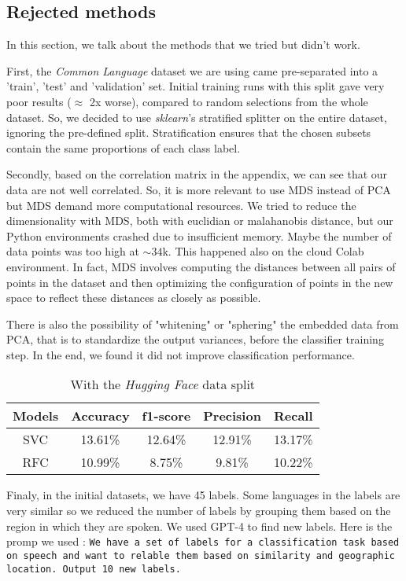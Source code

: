 \documentclass[twocolumn]{article}
\begin{document}
\subsection{Rejected methods}
\label{5.1}
In this section, we talk about the methods that we tried but didn't work.

First, the \textit{Common Language} dataset we are using came pre-separated into a 'train', 'test' and 'validation' set. Initial training runs with this split gave very poor results ($\approx$ 2x worse), compared to random selections from the whole dataset. So, we decided to use \textit{sklearn}'s stratified splitter on the entire dataset, ignoring the pre-defined split. Stratification ensures that the chosen subsets contain the same proportions of each class label.

Secondly, based on the correlation matrix in the appendix, we can see that our data are not well correlated. So, it is more relevant to use MDS instead of PCA but MDS demand more computational resources. We tried to reduce the dimensionality with MDS, both with euclidian or malahanobis distance, but our Python environments crashed due to insufficient memory. Maybe the number of data points was too high at $\sim34$k. This happened also on the cloud Colab environment. 
In fact, MDS involves computing the distances between all pairs of points in the dataset and then optimizing the configuration of points in the new space to reflect these distances as closely as possible.

There is also the possibility of "whitening" or "sphering" the embedded data from PCA, that is to standardize the output variances, before the classifier training step. In the end, we found it did not improve classification performance.

\begin{table}[h]
    \centering
    \begin{tabular}{|c|c|c|c|c|}
    \hline
      Models & Accuracy & f1-score & Precision & Recall\\  
      \hline
      SVC & 13.61\% & 12.64\% & 12.91\% & 13.17\%\\
        \hline
      RFC & 10.99\% & 8.75\% & 9.81\% & 10.22\% \\
    \hline
    \end{tabular}
    \label{tab:my_label}
    \caption{With the \textit{Hugging Face} data split}
\end{table}

Finaly, in the initial datasets, we have 45 labels. Some languages in the labels are very similar so we reduced the number of labels by grouping them based on the region in which they are spoken. We used GPT-4 to find new labels. Here is the promp we used : \texttt{We have a set of labels for a classification task based on speech and want to relable them based on similarity and geographic location. Output 10 new labels.}
\end{document}
